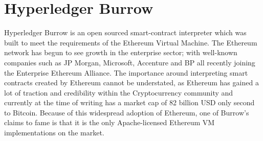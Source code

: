 \section{Hyperledger Burrow}

Hyperledger Burrow is an open sourced smart-contract interpreter which was built 
to meet the requirements of the Ethereum Virtual Machine. The Ethereum network has 
begun to see growth in the enterprise sector; with well-known companies such as 
JP Morgan, Microsoft, Accenture and BP all recently joining the Enterprise Ethereum 
Alliance.\cite{Behlendorf} The importance around interpreting smart contracts created
by Ethereum cannot be understated, as Ethereum has gained a lot of traction and
credibility within the Cryptocurrency community and currently at the time of writing
has a market cap of 82 billion USD only second to Bitcoin. Because of this widespread 
adoption of Ethereum, one of Burrow’s claims to fame is that it is the only 
Apache-licensed Ethereum VM implementations on the market.\cite{Hyperledger Burrow}


